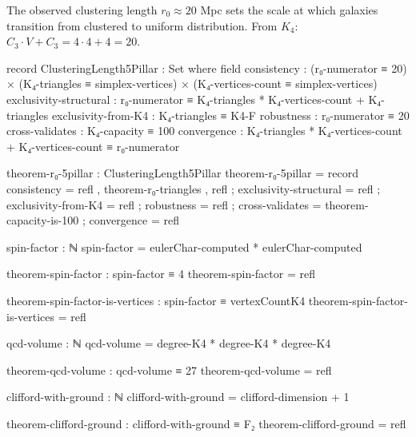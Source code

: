 \documentclass[11pt,a4paper]{book}
\begin{document}
The observed clustering length $r_0 \approx 20$ Mpc sets the scale at which galaxies transition from clustered to uniform distribution. From $K_4$: $C_3 \cdot V + C_3 = 4 \cdot 4 + 4 = 20$.

\begin{code}
record ClusteringLength5Pillar : Set where
  field
    consistency            : (r₀-numerator ≡ 20) × (K₄-triangles ≡ simplex-vertices) × (K₄-vertices-count ≡ simplex-vertices)
    exclusivity-structural : r₀-numerator ≡ K₄-triangles * K₄-vertices-count + K₄-triangles
    exclusivity-from-K4    : K₄-triangles ≡ K4-F
    robustness             : r₀-numerator ≡ 20
    cross-validates        : K₄-capacity ≡ 100
    convergence            : K₄-triangles * K₄-vertices-count + K₄-vertices-count ≡ r₀-numerator

theorem-r₀-5pillar : ClusteringLength5Pillar
theorem-r₀-5pillar = record
  { consistency            = refl , theorem-r₀-triangles , refl
  ; exclusivity-structural = refl
  ; exclusivity-from-K4    = refl
  ; robustness             = refl
  ; cross-validates        = theorem-capacity-is-100
  ; convergence            = refl
  }
\end{code}

\begin{code}
spin-factor : ℕ
spin-factor = eulerChar-computed * eulerChar-computed

theorem-spin-factor : spin-factor ≡ 4
theorem-spin-factor = refl

theorem-spin-factor-is-vertices : spin-factor ≡ vertexCountK4
theorem-spin-factor-is-vertices = refl

qcd-volume : ℕ
qcd-volume = degree-K4 * degree-K4 * degree-K4

theorem-qcd-volume : qcd-volume ≡ 27
theorem-qcd-volume = refl

clifford-with-ground : ℕ
clifford-with-ground = clifford-dimension + 1

theorem-clifford-ground : clifford-with-ground ≡ F₂
theorem-clifford-ground = refl
\end{code}
\end{document}
